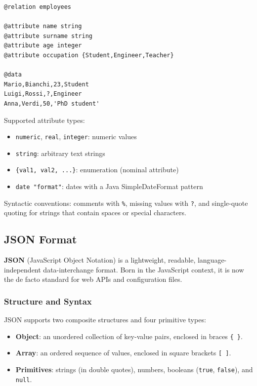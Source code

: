 \begin{lstlisting}[language={}, basicstyle=\ttfamily\scriptsize]
@relation employees

@attribute name string
@attribute surname string
@attribute age integer
@attribute occupation {Student,Engineer,Teacher}

@data
Mario,Bianchi,23,Student
Luigi,Rossi,?,Engineer
Anna,Verdi,50,'PhD student'
\end{lstlisting}

Supported attribute types:
\begin{itemize}
    \item \texttt{numeric}, \texttt{real}, \texttt{integer}: numeric values
    \item \texttt{string}: arbitrary text strings
    \item \texttt{\{val1, val2, ...\}}: enumeration (nominal attribute)
    \item \texttt{date "format"}: dates with a Java SimpleDateFormat pattern
\end{itemize}

Syntactic conventions: comments with \texttt{\%}, missing values with \texttt{?}, and single-quote quoting for strings that contain spaces or special characters.

\subsection{JSON Format}
\label{sec:json-format}

\textbf{JSON} (JavaScript Object Notation) is a lightweight, readable, language-independent data-interchange format. Born in the JavaScript context, it is now the de facto standard for web APIs and configuration files.

\subsubsection{Structure and Syntax}
\label{subsec:json-structure}

JSON supports two composite structures and four primitive types:

\begin{itemize}
    \item \textbf{Object}: an unordered collection of key-value pairs, enclosed in braces \texttt{\{ \}}.
    \item \textbf{Array}: an ordered sequence of values, enclosed in square brackets \texttt{[ ]}.
    \item \textbf{Primitives}: strings (in double quotes), numbers, booleans (\texttt{true}, \texttt{false}), and \texttt{null}.
\end{itemize}

